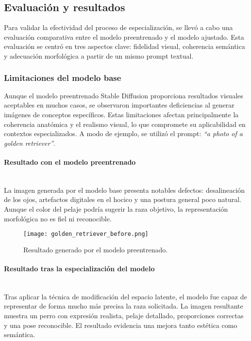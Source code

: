 \subsection{Evaluación y resultados}

Para validar la efectividad del proceso de especialización, se llevó a cabo una evaluación comparativa entre el modelo preentrenado y el modelo ajustado. Esta evaluación se centró en tres aspectos clave: fidelidad visual, coherencia semántica y adecuación morfológica a partir de un mismo prompt textual.

\subsubsection{Limitaciones del modelo base}

Aunque el modelo preentrenado Stable Diffusion proporciona resultados visuales aceptables en muchos casos, se observaron importantes deficiencias al generar imágenes de conceptos específicos. Estas limitaciones afectan principalmente la coherencia anatómica y el realismo visual, lo que compromete su aplicabilidad en contextos especializados. A modo de ejemplo, se utilizó el prompt: \textit{``a photo of a golden retriever''}.

\paragraph{\textbf{Resultado con el modelo preentrenado}} \mbox{}\\[0.5em]
La imagen generada por el modelo base presenta notables defectos: desalineación de los ojos, artefactos digitales en el hocico y una postura general poco natural. Aunque el color del pelaje podría sugerir la raza objetivo, la representación morfológica no es fiel ni reconocible.

\begin{figure}[H]
    \centering
    \texttt{[image: golden\_retriever\_before.png]}
    \caption{Resultado generado por el modelo preentrenado.}
    \label{fig:golden-before}
\end{figure}

\paragraph{\textbf{Resultado tras la especialización del modelo}} \mbox{}\\[0.5em]
Tras aplicar la técnica de modificación del espacio latente, el modelo fue capaz de representar de forma mucho más precisa la raza solicitada. La imagen resultante muestra un perro con expresión realista, pelaje detallado, proporciones correctas y una pose reconocible. El resultado evidencia una mejora tanto estética como semántica.

